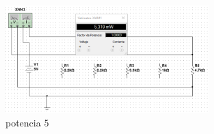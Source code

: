 \documentclass[letterpaper,12pt]{article}
\begin{document}
\begin{sloppypar}
\begin{enumerate}
\begin{figure}[H]
        \centering
        \includegraphics[width=0.7\textwidth]{images/proytec/pp5.png}
        \caption{potencia 5}
    \end{figure}
\end{enumerate}


\end{sloppypar}
\end{document}
